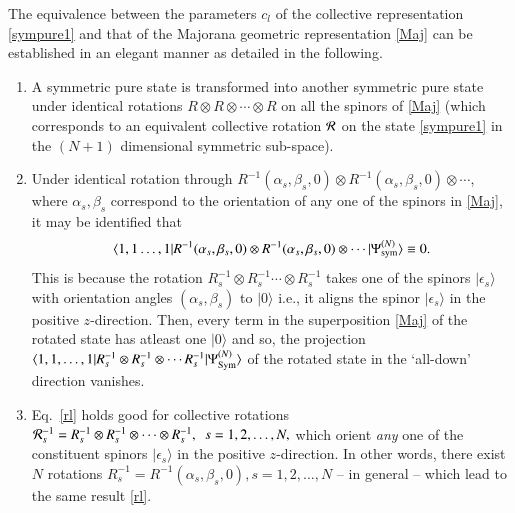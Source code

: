 The equivalence between the parameters $c_l$ of the collective representation \eqref{sympure1} and that of  the Majorana geometric representation \eqref{Maj} can be established in an elegant manner \cite{usa1,usa2,usa} as detailed in the following. 
\begin{enumerate}
\item A symmetric pure state is transformed into another symmetric pure state under identical rotations $R\otimes R\otimes \cdots \otimes R$ on all the spinors of \eqref{Maj} (which corresponds  to an equivalent collective rotation ${\cal R}$ on the state \eqref{sympure1} in the $(N+1)$ dimensional symmetric sub-space). 

\item Under identical rotation through $R^{-1}(\alpha_s,\beta_s,0)\otimes R^{-1}(\alpha_s,\beta_s,0)\otimes \cdots  $, where $\alpha_s, \beta_s$ correspond to the orientation of any one of the spinors in \eqref{Maj}, it may be identified that 
\begin{equation}
\langle 1,1\ldots , 1\vert R^{-1}(\alpha_s,\beta_s,0)\otimes R^{-1}(\alpha_s,\beta_s,0)\otimes 
\cdots   \vert \Psi^{(N)}_{\rm sym}\rangle\equiv 0.\label{rl}
\end{equation}
This is because the rotation $R_s^{-1}\otimes R_s^{-1}\cdots \otimes R_s^{-1}$ takes one of the spinors $\vert \epsilon_s\rangle$ with orientation angles $(\alpha_s, \beta_s)$ to $\vert 0\rangle$ i.e., it aligns the spinor $\vert \epsilon_s\rangle$ in the positive $z$-direction. Then, every   term in the  superposition \eqref{Maj} of the rotated state has atleast one $\vert 0\rangle$ and so, the projection $\langle 1,1,\ldots, 1\vert R_s^{-1}\otimes R_s^{-1}\otimes \cdots R_s^{-1}\vert \Psi^{(N)}_{\rm Sym}\rangle$ of the rotated state in the `all-down' direction vanishes. 

\item Eq.~\eqref{rl} holds good for  collective rotations ${\cal R}_s^{-1}=R^{-1}_s\otimes R^{-1}_s\otimes\cdots\otimes R^{-1}_s,\ \ s=1,2,\ldots, N,$ which orient {\em any} one of the constituent spinors $\vert\epsilon_s\rangle$ in the positive $z$-direction. In other words, there exist $N$ rotations $R^{-1}_s=R^{-1}(\alpha_s,\beta_s,0), s=1,2,\ldots , N$ -- in general -- which lead to the same result  \eqref{rl}.


\end{enumerate}

